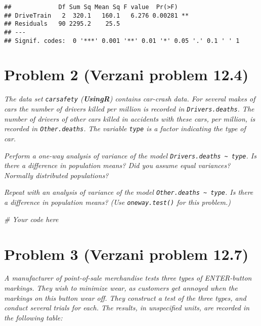 \documentclass[
]{article}
\newenvironment{Shaded}{\begin{snugshade}}{\end{snugshade}}
\newcommand{\CommentTok}[1]{\textcolor[rgb]{0.56,0.35,0.01}{\textit{#1}}}
\begin{document}
\begin{verbatim}
##             Df Sum Sq Mean Sq F value  Pr(>F)   
## DriveTrain   2  320.1   160.1   6.276 0.00281 **
## Residuals   90 2295.2    25.5                   
## ---
## Signif. codes:  0 '***' 0.001 '**' 0.01 '*' 0.05 '.' 0.1 ' ' 1
\end{verbatim}

\hypertarget{problem-2-verzani-problem-12.4}{%
\section{Problem 2 (Verzani problem
12.4)}\label{problem-2-verzani-problem-12.4}}

\emph{The data set \texttt{carsafety} (\textbf{UsingR}) contains
car-crash data. For several makes of cars the number of drivers killed
per million is recorded in \texttt{Drivers.deaths}. The number of
drivers of other cars killed in accidents with these cars, per million,
is recorded in \texttt{Other.deaths}. The variable \texttt{type} is a
factor indicating the type of car.}

\emph{Perform a one-way analysis of variance of the model
\texttt{Drivers.deaths\ \textasciitilde{}\ type}. Is there a difference
in population means? Did you assume equal variances? Normally
distributed populations?}

\emph{Repeat with an analysis of variance of the model
\texttt{Other.deaths\ \textasciitilde{}\ type}. Is there a difference in
population means? (Use \texttt{oneway.test()} for this problem.)}

\begin{Shaded}
\begin{Highlighting}[]
\CommentTok{\# Your code here}
\end{Highlighting}
\end{Shaded}

\hypertarget{problem-3-verzani-problem-12.7}{%
\section{Problem 3 (Verzani problem
12.7)}\label{problem-3-verzani-problem-12.7}}

\emph{A manufacturer of point-of-sale merchandise tests three types of
ENTER-button markings. They wish to minimize wear, as customers get
annoyed when the markings on this button wear off. They construct a test
of the three types, and conduct several trials for each. The results, in
unspecified units, are recorded in the following table:}
\end{document}
